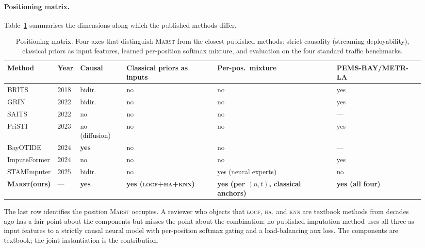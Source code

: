 \documentclass[11pt]{article}
\newcommand{\MARST}{\textsc{Marst}\xspace}
\newcommand{\LOCF}{\textsc{locf}\xspace}
\newcommand{\HA}{\textsc{ha}\xspace}
\newcommand{\KNN}{\textsc{knn}\xspace}
\begin{document}
\paragraph{Positioning matrix.}
Table~\ref{tab:positioning} summarises the dimensions along which the
published methods differ.

\begin{table}[!htbp]
\centering
\caption{Positioning matrix.  Four axes that distinguish \MARST from
the closest published methods: strict causality (streaming
deployability), classical priors as input features, learned
per-position softmax mixture, and evaluation on the four standard
traffic benchmarks.}
\label{tab:positioning}
\small
\begin{tabularx}{\linewidth}{lllllX}
\toprule
\textbf{Method} & \textbf{Year} & \textbf{Causal} & \textbf{Classical priors as inputs} & \textbf{Per-pos.\ mixture} & \textbf{PEMS-BAY/METR-LA} \\
\midrule
BRITS \citep{cao2018brits}                  & 2018 & bidir.\         & no  & no                       & yes \\
GRIN \citep{cini2022grin}                   & 2022 & bidir.\         & no  & no                       & yes \\
SAITS \citep{du2023saits}                   & 2022 & no              & no  & no                       & --- \\
PriSTI \citep{liu2023pristi}                & 2023 & no (diffusion)  & no  & no                       & yes \\
BayOTIDE \citep{fang2024bayotide}           & 2024 & \textbf{yes}    & no  & no                       & --- \\
ImputeFormer \citep{nie2024imputeformer}    & 2024 & no              & no  & no                       & yes \\
STAMImputer \citep{wang2025stamimputer}     & 2025 & bidir.\         & no  & yes (neural experts)     & no \\
\textbf{\MARST (ours)}                      & ---  & \textbf{yes}    & \textbf{yes (\LOCF{}+\HA{}+\KNN)} & \textbf{yes (per $(n,t)$, classical anchors)} & \textbf{yes (all four)} \\
\bottomrule
\end{tabularx}
\end{table}

The last row identifies the position \MARST occupies.  A reviewer who
objects that \LOCF, \HA, and \KNN are textbook methods from decades ago
has a fair point about the components but misses the point about the
combination: no published imputation method uses all three as input
features to a strictly causal neural model with per-position softmax
gating and a load-balancing aux loss.  The components are textbook; the
joint instantiation is the contribution.
\end{document}

